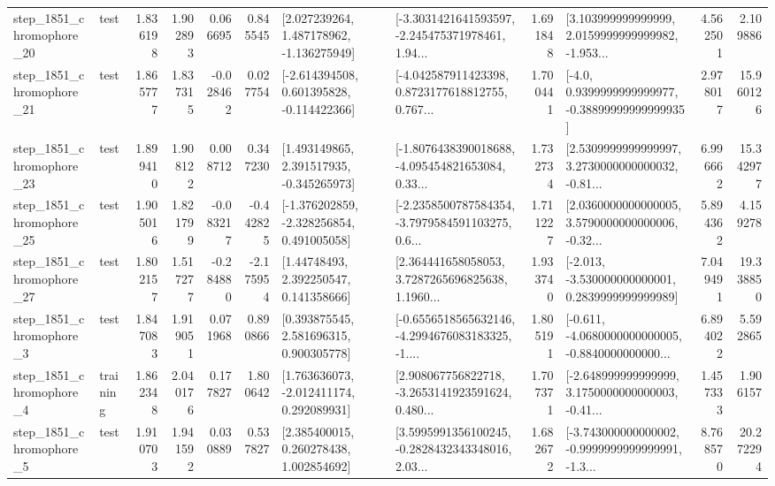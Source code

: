 \begin{tabular}{llrrrrllrlrr}
 step\_1851\_chromophore\_20 &      test &      1.836198 &    1.902893 &      0.066695 &  0.845545 &    [2.027239264, 1.487178962, -1.136275949] &  [-3.3031421641593597, -2.245475371978461, 1.94... &       1.691848 &  [3.103999999999999, 2.0159999999999982, -1.953... &            4.562501 &          2.109886 \\
 step\_1851\_chromophore\_21 &      test &      1.865777 &    1.837315 &     -0.028462 &  0.027754 &   [-2.614394508, 0.601395828, -0.114422366] &  [-4.042587911423398, 0.8723177618812755, 0.767... &       1.700441 &   [-4.0, 0.9399999999999977, -0.38899999999999935] &            2.978017 &         15.960126 \\
 step\_1851\_chromophore\_23 &      test &      1.899410 &    1.908122 &      0.008712 &  0.347230 &    [1.493149865, 2.391517935, -0.345265973] &  [-1.8076438390018688, -4.095454821653084, 0.33... &       1.732734 &  [2.5309999999999997, 3.2730000000000032, -0.81... &            6.996662 &         15.342977 \\
 step\_1851\_chromophore\_25 &      test &      1.905016 &    1.821799 &     -0.083217 & -0.442825 &   [-1.376202859, -2.328256854, 0.491005058] &  [-2.2358500787584354, -3.7979584591103275, 0.6... &       1.711227 &  [2.0360000000000005, 3.5790000000000006, -0.32... &            5.894362 &          4.159278 \\
 step\_1851\_chromophore\_27 &      test &      1.802157 &    1.517277 &     -0.284880 & -2.175954 &      [1.44748493, 2.392250547, 0.141358666] &  [2.364441658058053, 3.7287265696825638, 1.1960... &       1.933740 &   [-2.013, -3.530000000000001, 0.2839999999999989] &            7.049491 &         19.338850 \\
  step\_1851\_chromophore\_3 &      test &      1.847083 &    1.919051 &      0.071968 &  0.890866 &     [0.393875545, 2.581696315, 0.900305778] &  [-0.6556518565632146, -4.2994676083183325, -1.... &       1.805191 &  [-0.611, -4.0680000000000005, -0.8840000000000... &            6.894022 &          5.592865 \\
  step\_1851\_chromophore\_4 &  training &      1.862348 &    2.040176 &      0.177827 &  1.800642 &    [1.763636073, -2.012411174, 0.292089931] &  [2.908067756822718, -3.2653141923591624, 0.480... &       1.707371 &  [-2.648999999999999, 3.1750000000000003, -0.41... &            1.457333 &          1.906157 \\
  step\_1851\_chromophore\_5 &      test &      1.910703 &    1.941592 &      0.030889 &  0.537827 &     [2.385400015, 0.260278438, 1.002854692] &  [3.5995991356100245, -0.2828432343348016, 2.03... &       1.682672 &  [-3.743000000000002, -0.9999999999999991, -1.3... &            8.768570 &         20.272294 \\

\end{tabular}
